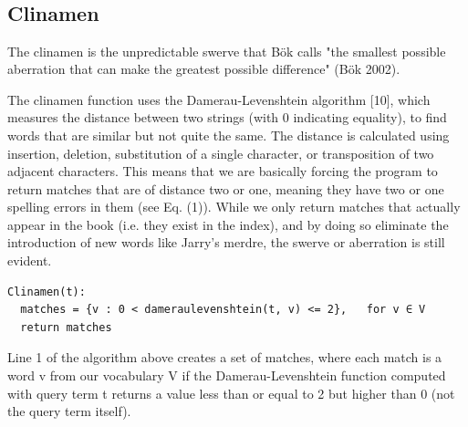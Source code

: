  \\
 \\
 \\
 \\
 \\
 \\
 \\
 \\
 \\
 

\subsection{Clinamen}

The clinamen is the unpredictable swerve that Bök calls "the smallest possible aberration that can make the greatest possible difference" (Bök 2002).

The clinamen function uses the Damerau-Levenshtein algorithm [10], which measures the distance between two strings (with 0 indicating equality), to find words that are similar but not quite the same. The distance is calculated using insertion, deletion, substitution of a single character, or transposition of two adjacent characters. This means that we are basically forcing the program to return matches that are of distance two or one, meaning they have two or one spelling errors in them (see Eq. (1)). While we only return matches that actually appear in the book (i.e. they exist in the index), and by doing so eliminate the introduction of new words like Jarry's merdre, the swerve or aberration is still evident.

\begin{lstlisting}
Clinamen(t):
  matches = {v : 0 < dameraulevenshtein(t, v) <= 2},   for v ∈ V
  return matches
\end{lstlisting}

Line 1 of the algorithm above creates a set of matches, where each match is a word v from our vocabulary V if the Damerau-Levenshtein function computed with query term t returns a value less than or equal to 2 but higher than 0 (not the query term itself).

